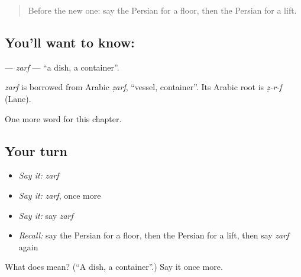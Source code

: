 \label{lesson:FA-C203-zarf}



\begin{quote}
Before the new one: say the Persian for a floor, then the Persian for a lift.
\end{quote}

\subsection*{You'll want to know: }
\textbf{} — \emph{zarf} — \textquotedblleft{}a dish, a container\textquotedblright{}.

\begin{cousinweb}
\emph{zarf} is borrowed from Arabic \emph{ẓarf}, \textquotedblleft{}vessel, container\textquotedblright{}. Its Arabic root is \emph{ẓ-r-f} (Lane).
\end{cousinweb}

\begin{grammarlens}[title={What you've built}]
One more word for this chapter.
\end{grammarlens}

\subsection*{Your turn}
\begin{itemize}
\raggedright
  \item \emph{Say it:} \emph{zarf}
  \item \emph{Say it:} \emph{zarf}, once more
  \item \emph{Say it:} say \emph{zarf}
  \item \emph{Recall:} say the Persian for a floor, then the Persian for a lift, then say \emph{zarf} again
\end{itemize}

\begin{tcolorbox}[breakable,colback=teal!4,colframe=teal!35!black,title={Before you move on}]
What does  mean? (\textquotedblleft{}A dish, a container\textquotedblright{}.) Say it once more.
\end{tcolorbox}
